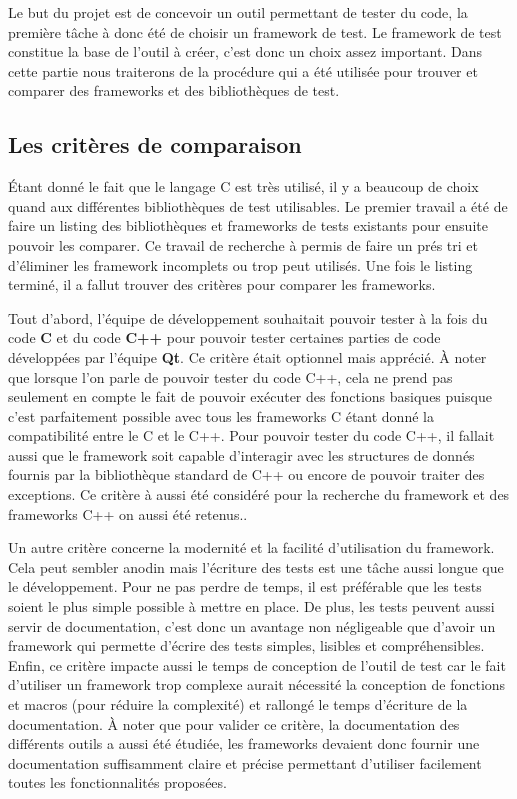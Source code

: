 \documentclass[a4paper]{article}
\begin{document}
Le but du projet est de concevoir un outil permettant de tester du code, la
première tâche à donc été de choisir un framework de test. Le framework de test
constitue la base de l'outil à créer, c'est donc un choix assez important. Dans
cette partie nous traiterons de la procédure qui a été utilisée pour trouver et
comparer des frameworks et des bibliothèques de test.

\subsection{Les critères de comparaison}

Étant donné le fait que le langage C est très utilisé, il y a beaucoup de choix
quand aux différentes bibliothèques de test utilisables. Le premier travail a
été de faire un listing des bibliothèques et frameworks de tests existants pour
ensuite pouvoir les comparer. Ce travail de recherche à permis de faire un prés
tri et d'éliminer les framework incomplets ou trop peut utilisés. Une fois le
listing terminé, il a fallut trouver des critères pour comparer les frameworks.

Tout d'abord, l'équipe de développement souhaitait pouvoir tester à la fois du
code \textbf{C} et du code \textbf{C++} pour pouvoir tester certaines parties de
code développées par l'équipe \textbf{Qt}. Ce critère était optionnel mais
apprécié. À noter que lorsque l'on parle de pouvoir tester du code C++, cela ne
prend pas seulement en compte le fait de pouvoir exécuter des fonctions basiques
puisque c'est parfaitement possible avec tous les frameworks C étant donné la
compatibilité entre le C et le C++. Pour pouvoir tester du code C++, il fallait
aussi que le framework soit capable d'interagir avec les structures de donnés
fournis par la bibliothèque standard de C++ ou encore de pouvoir traiter des
exceptions. Ce critère à aussi été considéré pour la recherche du framework et
des frameworks C++ on aussi été retenus..

Un autre critère concerne la modernité et la facilité d'utilisation du
framework. Cela peut sembler anodin mais l'écriture des tests est une tâche
aussi longue que le développement. Pour ne pas perdre de temps, il est
préférable que les tests soient le plus simple possible à mettre en place. De
plus, les tests peuvent aussi servir de documentation, c'est donc un avantage
non négligeable que d'avoir un framework qui permette d'écrire des tests
simples, lisibles et compréhensibles. Enfin, ce critère impacte aussi le temps
de conception de l'outil de test car le fait d'utiliser un framework trop
complexe aurait nécessité la conception de fonctions et macros (pour réduire la
complexité) et rallongé le temps d'écriture de la documentation. À noter que
pour valider ce critère, la documentation des différents outils a aussi été
étudiée, les frameworks devaient donc fournir une documentation suffisamment
claire et précise permettant d'utiliser facilement toutes les fonctionnalités
proposées.
\end{document}
